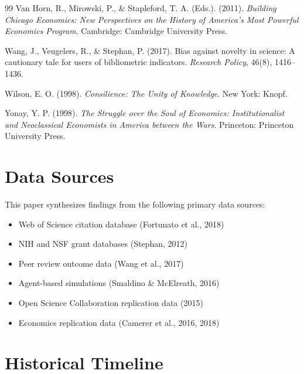 \documentclass[12pt,a4paper]{article}
\begin{document}
\begin{thebibliography}{99}
Van Horn, R., Mirowski, P., \& Stapleford, T. A. (Eds.). (2011). \textit{Building Chicago Economics: New Perspectives on the History of America's Most Powerful Economics Program}. Cambridge: Cambridge University Press.

Wang, J., Veugelers, R., \& Stephan, P. (2017). Bias against novelty in science: A cautionary tale for users of bibliometric indicators. \textit{Research Policy}, 46(8), 1416--1436.

Wilson, E. O. (1998). \textit{Consilience: The Unity of Knowledge}. New York: Knopf.

Yonay, Y. P. (1998). \textit{The Struggle over the Soul of Economics: Institutionalist and Neoclassical Economists in America between the Wars}. Princeton: Princeton University Press.

\end{thebibliography}

\appendix
\section{Data Sources}
\label{app:data}

This paper synthesizes findings from the following primary data sources:
\begin{itemize}[nosep]
\item Web of Science citation database (Fortunato et al., 2018)
\item NIH and NSF grant databases (Stephan, 2012)
\item Peer review outcome data (Wang et al., 2017)
\item Agent-based simulations (Smaldino \& McElreath, 2016)
\item Open Science Collaboration replication data (2015)
\item Economics replication data (Camerer et al., 2016, 2018)
\end{itemize}

\section{Historical Timeline}
\label{app:timeline}
\end{document}
